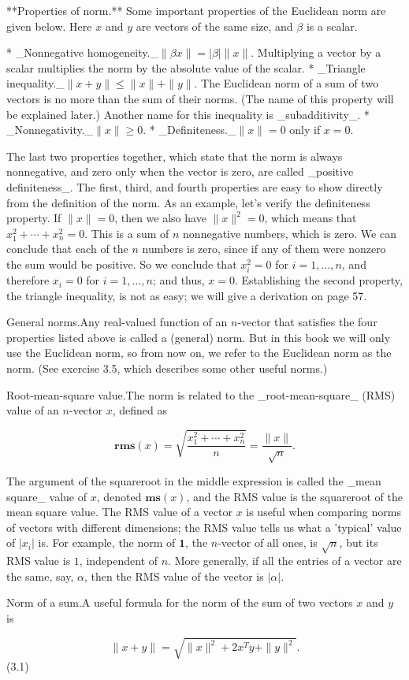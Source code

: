 

**Properties of norm.** Some important properties of the Euclidean norm are given below. Here \(x\) and \(y\) are vectors of the same size, and \(\beta\) is a scalar.

* _Nonnegative homogeneity._\(\|\beta x\|=|\beta|\|x\|\). Multiplying a vector by a scalar multiplies the norm by the absolute value of the scalar.
* _Triangle inequality._\(\|x+y\|\leq\|x\|+\|y\|\). The Euclidean norm of a sum of two vectors is no more than the sum of their norms. (The name of this property will be explained later.) Another name for this inequality is _subadditivity_.
* _Nonnegativity._\(\|x\|\geq 0\).
* _Definiteness._\(\|x\|=0\) only if \(x=0\).

The last two properties together, which state that the norm is always nonnegative, and zero only when the vector is zero, are called _positive definiteness_. The first, third, and fourth properties are easy to show directly from the definition of the norm. As an example, let's verify the definiteness property. If \(\|x\|=0\), then we also have \(\|x\|^{2}=0\), which means that \(x_{1}^{2}+\cdots+x_{n}^{2}=0\). This is a sum of \(n\) nonnegative numbers, which is zero. We can conclude that each of the \(n\) numbers is zero, since if any of them were nonzero the sum would be positive. So we conclude that \(x_{i}^{2}=0\) for \(i=1,\ldots,n\), and therefore \(x_{i}=0\) for \(i=1,\ldots,n\); and thus, \(x=0\). Establishing the second property, the triangle inequality, is not as easy; we will give a derivation on page 57.

General norms.Any real-valued function of an \(n\)-vector that satisfies the four properties listed above is called a (general) norm. But in this book we will only use the Euclidean norm, so from now on, we refer to the Euclidean norm as the norm. (See exercise 3.5, which describes some other useful norms.)

Root-mean-square value.The norm is related to the _root-mean-square_ (RMS) value of an \(n\)-vector \(x\), defined as

\[\mathbf{rms}(x)=\sqrt{\frac{x_{1}^{2}+\cdots+x_{n}^{2}}{n}}=\frac{\|x\|}{ \sqrt{n}}.\]

The argument of the squareroot in the middle expression is called the _mean square_ value of \(x\), denoted \(\mathbf{ms}(x)\), and the RMS value is the squareroot of the mean square value. The RMS value of a vector \(x\) is useful when comparing norms of vectors with different dimensions; the RMS value tells us what a 'typical' value of \(|x_{i}|\) is. For example, the norm of \(\mathbf{1}\), the \(n\)-vector of all ones, is \(\sqrt{n}\), but its RMS value is \(1\), independent of \(n\). More generally, if all the entries of a vector are the same, say, \(\alpha\), then the RMS value of the vector is \(|\alpha|\).

Norm of a sum.A useful formula for the norm of the sum of two vectors \(x\) and \(y\) is

\[\|x+y\|=\sqrt{\|x\|^{2}+2x^{T}y+\|y\|^{2}}.\] (3.1)